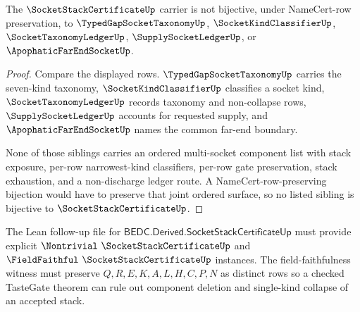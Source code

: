 \begin{theorem}
\label{thm:socket-stack-certificate-sibling-independence}
The $\SocketStackCertificateUp$ carrier is not bijective, under NameCert-row preservation, to $\TypedGapSocketTaxonomyUp$, $\SocketKindClassifierUp$, $\SocketTaxonomyLedgerUp$, $\SupplySocketLedgerUp$, or $\ApophaticFarEndSocketUp$.
\end{theorem}
\begin{proof}
Compare the displayed rows. $\TypedGapSocketTaxonomyUp$ carries the seven-kind taxonomy, $\SocketKindClassifierUp$ classifies a socket kind, $\SocketTaxonomyLedgerUp$ records taxonomy and non-collapse rows, $\SupplySocketLedgerUp$ accounts for requested supply, and $\ApophaticFarEndSocketUp$ names the common far-end boundary.

None of those siblings carries an ordered multi-socket component list with stack exposure, per-row narrowest-kind classifiers, per-row gate preservation, stack exhaustion, and a non-discharge ledger route. A NameCert-row-preserving bijection would have to preserve that joint ordered surface, so no listed sibling is bijective to $\SocketStackCertificateUp$.
\end{proof}



The Lean follow-up file for $\mathsf{BEDC.Derived.SocketStackCertificateUp}$ must provide explicit $\Nontrivial\ \SocketStackCertificateUp$ and $\FieldFaithful\ \SocketStackCertificateUp$ instances. The field-faithfulness witness must preserve $Q,R,E,K,A,L,H,C,P,N$ as distinct rows so a checked TasteGate theorem can rule out component deletion and single-kind collapse of an accepted stack.


